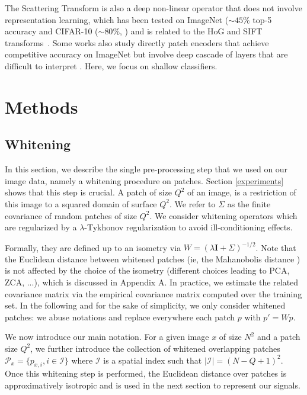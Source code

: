 \documentclass{article}
\newcommand{\Edouard}[1]{\textcolor{blue}{#1}}
\begin{document}
The Scattering Transform \citep{mallat2012group} is also a deep non-linear operator that does not involve representation learning, which has been tested on ImageNet ($\sim 45\%$ top-5 accuracy \citep{zarka2019deep} and  CIFAR-10 ($\sim 80 \%$, \citep{Oyallon_2015_CVPR}) and is related to the HoG and SIFT transforms~\citep{Oyallon_2018_ECCV}.
Some works also study directly patch encoders that achieve competitive accuracy on ImageNet but involve deep cascade of layers that are difficult to interpret \citep{oyallon2017scaling,zarka2019deep,brendel2019approximating}. Here, we focus on shallow classifiers. %

\section{Methods}
\label{method}

\subsection{Whitening}

In this section, we describe the single pre-processing step that we used on our image data, namely a whitening procedure on patches. Section \ref{experiments} shows that this step is crucial. A patch of size $Q^2$ of an image, is a  restriction of this image to a squared domain of surface $Q^2$. We refer to  $\Sigma$ as the finite covariance of random patches of size $Q^2$. We consider whitening operators which are regularized by a $\lambda$-Tykhonov regularization to avoid ill-conditioning effects.

Formally, they are defined up to an isometry via $W=(\lambda \mathbf{I}+\Sigma
)^{-1/2}$.  Note that the Euclidean distance between whitened patches (ie, the Mahanobolis distance \citep{chandra1936generalised}) is not affected by the choice of the isometry (different choices leading to PCA, ZCA, ...), which is discussed in Appendix A. In practice, we estimate the related covariance matrix via the empirical covariance matrix  computed over the training set. In the following and for the sake of simplicity, we  only  consider whitened patches: we  abuse notations and replace everywhere each patch $p$ with $p'=Wp$.
 
 
We now introduce our main notation. For a given image $x$ of size $N^2$ and a patch size $Q^2$, we further introduce the collection of whitened overlapping patches $\mathcal{P}_x=\{p_{x,i},i\in\mathcal{I}\}$ where $\mathcal{I}$ is a spatial index such that $|\mathcal{I}|=(N-Q+1)
^2$.
Once this whitening step is performed, the Euclidean distance over patches is approximatively isotropic and is used in the next section to represent our signals.
\end{document}
